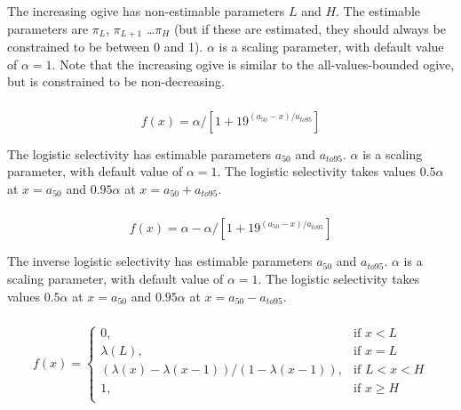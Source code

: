 The increasing ogive has non-estimable parameters $L$ and $H$. The estimable parameters are $\pi_L$, $\pi_{L+1}$ \ldots $\pi_H$ (but if these are estimated, they should always be constrained to be between 0 and 1). $\alpha$ is a scaling parameter, with default value of $\alpha = 1$. Note that the increasing ogive is similar to the all-values-bounded ogive, but is constrained to be non-decreasing.

\subsubsection[Logistic]{}

\begin{equation}
  f(x) = \alpha / [1+19^{(a_{50}-x)/a_{to95}}]
\end{equation}
 
The logistic selectivity has estimable parameters $a_{50}$ and $a_{to95}$. $\alpha$ is a scaling parameter, with default value of $\alpha = 1$. The logistic selectivity takes values $0.5 \alpha$ at $x=a_{50}$ and $0.95 \alpha$ at $x=a_{50}+a_{to95}$. 

\subsubsection[Inverse logistic]{}

\begin{equation}
  f(x) = \alpha - \alpha / [1+19^{(a_{50}-x)/a_{to95}}]
\end{equation}
 
The inverse logistic selectivity has estimable parameters $a_{50}$ and $a_{to95}$. $\alpha$ is a scaling parameter, with default value of $\alpha = 1$. The logistic selectivity takes values $0.5 \alpha$ at $x=a_{50}$ and $0.95 \alpha$ at $x=a_{50}-a_{to95}$. 

\subsubsection[Logistic producing]{}

\begin{equation} 
f(x)=\begin{cases}
	  0, & \text{if $x < L$} \\
	  \lambda(L), & \text{if $x=L$} \\
	  \left( \lambda(x)-\lambda(x-1) \right) / \left( 1-\lambda(x-1) \right), & \text{if $L < x < H$} \\
	  1, & \text{if $x \ge H$} \\  
  \end{cases}
\end{equation}

